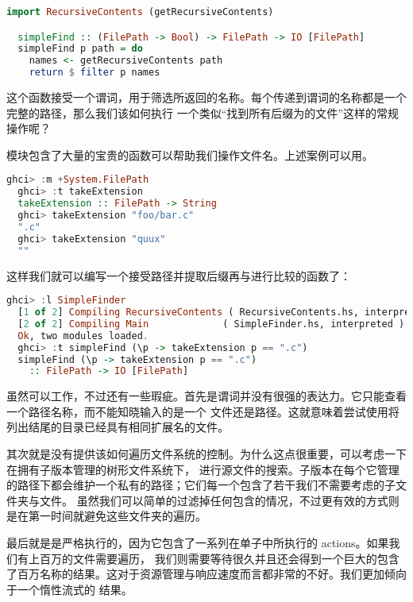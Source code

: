 \documentclass[./main.tex]{subfiles}
\begin{document}
\begin{lstlisting}[language=Haskell]
  import RecursiveContents (getRecursiveContents)

  simpleFind :: (FilePath -> Bool) -> FilePath -> IO [FilePath]
  simpleFind p path = do
    names <- getRecursiveContents path
    return $ filter p names
\end{lstlisting}

这个函数接受一个谓词，用于筛选所返回的名称。每个传递到谓词的名称都是一个完整的路径，那么我们该如何执行
一个类似“找到所有后缀为的文件”这样的常规操作呢？

模块包含了大量的宝贵的函数可以帮助我们操作文件名。上述案例可以用。

\begin{lstlisting}[language=Haskell]
  ghci> :m +System.FilePath
  ghci> :t takeExtension
  takeExtension :: FilePath -> String
  ghci> takeExtension "foo/bar.c"
  ".c"
  ghci> takeExtension "quux"
  ""
\end{lstlisting}

这样我们就可以编写一个接受路径并提取后缀再与进行比较的函数了：

\begin{lstlisting}[language=Haskell]
  ghci> :l SimpleFinder
  [1 of 2] Compiling RecursiveContents ( RecursiveContents.hs, interpreted )
  [2 of 2] Compiling Main             ( SimpleFinder.hs, interpreted )
  Ok, two modules loaded.
  ghci> :t simpleFind (\p -> takeExtension p == ".c")
  simpleFind (\p -> takeExtension p == ".c")
    :: FilePath -> IO [FilePath]
\end{lstlisting}

虽然可以工作，不过还有一些瑕疵。首先是谓词并没有很强的表达力。它只能查看一个路径名称，而不能知晓输入的是一个
文件还是路径。这就意味着尝试使用将列出结尾的目录已经具有相同扩展名的文件。

其次就是没有提供该如何遍历文件系统的控制。为什么这点很重要，可以考虑一下在拥有子版本管理的树形文件系统下，
进行源文件的搜索。子版本在每个它管理的路径下都会维护一个私有的路径；它们每一个包含了若干我们不需要考虑的子文件夹与文件。
虽然我们可以简单的过滤掉任何包含的情况，不过更有效的方式则是在第一时间就避免这些文件夹的遍历。

最后就是是严格执行的，因为它包含了一系列在单子中所执行的 actions。如果我们有上百万的文件需要遍历，
我们则需要等待很久并且还会得到一个巨大的包含了百万名称的结果。这对于资源管理与响应速度而言都非常的不好。我们更加倾向于一个惰性流式的
结果。
\end{document}
